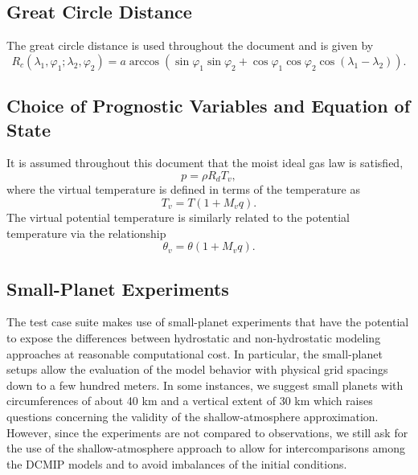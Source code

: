 \documentclass[times,doublespace]{fldauth}
\begin{document}
\subsection{Great Circle Distance}

The great circle distance is used throughout the document and is given by
\begin{equation}
R_c(\lambda_1, \varphi_1; \lambda_2, \varphi_2) = a \arccos \left( \sin \varphi_1 \sin \varphi_2 + \cos \varphi_1 \cos \varphi_2 \cos (\lambda_1 - \lambda_2) \right).
\end{equation}

\subsection{Choice of Prognostic Variables and Equation of State}

It is assumed throughout this document that the moist ideal gas law is satisfied,
\begin{equation} \label{eq:idealgaslaw}
p = \rho R_d T_v, 
\end{equation} where the virtual temperature is defined in terms of the temperature as
\begin{equation} \label{eq:virtualtemperature}
T_v = T (1 + M_v q).
\end{equation}  The virtual potential temperature is similarly related to the potential temperature via the relationship
\begin{equation}
\theta_v = \theta (1 + M_v q).
\end{equation}

\subsection{Small-Planet Experiments}
The test case suite makes use of small-planet experiments that have the potential to expose the differences between hydrostatic and non-hydrostatic modeling approaches at reasonable computational cost. In particular, the small-planet setups allow the evaluation of the model behavior with physical grid spacings down to a few hundred meters. In some instances, we suggest small planets with circumferences of about 40 km and a vertical extent of 30 km which raises questions concerning the validity of the shallow-atmosphere approximation. However, since the experiments are not compared to observations, we still ask for the use of the shallow-atmosphere approach to allow for intercomparisons among the DCMIP models and to avoid imbalances of the initial conditions.
\end{document}
